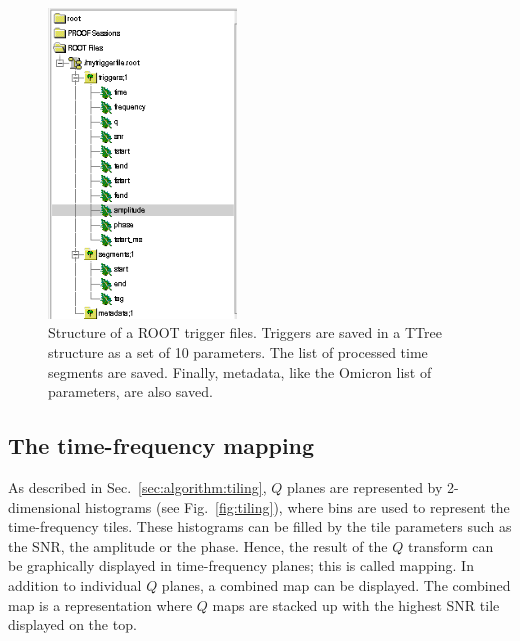 \begin{figure}
  \center
  \includegraphics[width=5cm]{./figures/triggerfile.png}
  \caption{Structure of a ROOT trigger files. Triggers are saved in a TTree structure as a set of 10 parameters. The list of processed time segments are saved. Finally, metadata, like the Omicron list of parameters, are also saved.}
  \label{fig:triggerfile}
\end{figure}


\subsection{The time-frequency mapping} \label{sec:algorithm:mapping}

As described in Sec.~\ref{sec:algorithm:tiling}, $Q$ planes are represented by 2-dimensional histograms (see Fig.~\ref{fig:tiling}), where bins are used to represent the time-frequency tiles. These histograms can be filled by the tile parameters such as the SNR, the amplitude or the phase. Hence, the result of the $Q$ transform can be graphically displayed in time-frequency planes; this is called mapping. In addition to individual $Q$ planes, a combined map can be displayed. The combined map is a representation where $Q$ maps are stacked up with the highest SNR tile displayed on the top.

